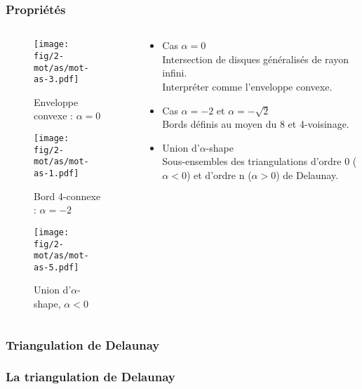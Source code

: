 \begin{frame}
\frametitle{Propriétés}
\begin{columns}[t]
  \begin{column}{0.5\linewidth}
    {
      \begin{figure}[H]
        \centering
        \texttt{[image: fig/2-mot/as/mot-as-3.pdf]}
        \caption{Enveloppe convexe : $\alpha = 0$}
      \end{figure}
    }
    {
      \begin{figure}[H]
        \centering
        \texttt{[image: fig/2-mot/as/mot-as-1.pdf]}
        \caption{Bord 4-connexe : $\alpha = -2$}
      \end{figure}
    }
    {
      \begin{figure}[H]
        \centering
        \texttt{[image: fig/2-mot/as/mot-as-5.pdf]}
        \caption{Union d'$\alpha$-shape, $\alpha < 0$}
      \end{figure}
    }  
  
  \end{column}
  \begin{column}{0.5\linewidth}
    \begin{block}{}
      \begin{itemize}
        \item<1-> Cas $\alpha = 0$\\
        Intersection de disques généralisés de rayon infini.\\
        Interpréter comme l'enveloppe convexe.
        \item<2-> Cas $\alpha = -2$ et $\alpha = -\sqrt{2}$\\
        Bords définis au moyen du 8 et 4-voisinage.
        \item<3-> Union d'$\alpha$-shape\\
        Sous-ensembles des triangulations d’ordre 0 ($\alpha < 0$) et d’ordre n ($\alpha > 0$) de Delaunay.
      \end{itemize}
    \end{block} 
  \end{column}
\end{columns}


\end{frame}

\subsubsection{Triangulation de Delaunay}

\begin{frame}
\frametitle{La triangulation de Delaunay}

\end{frame}
